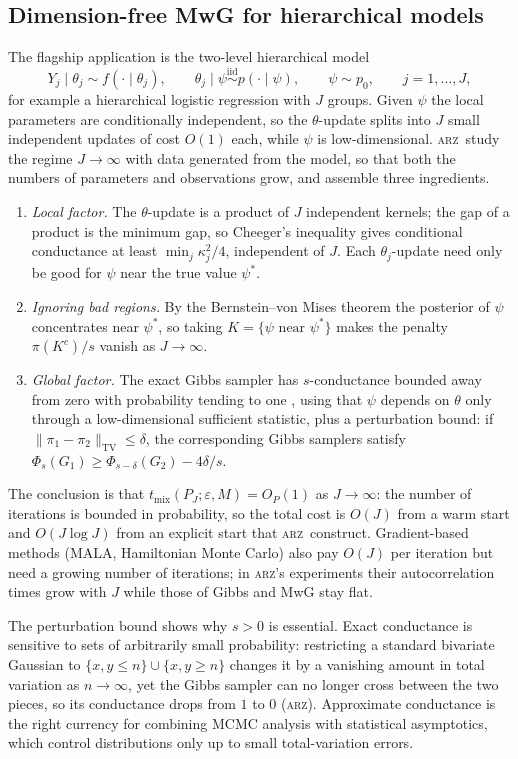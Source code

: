 \documentclass[11pt]{article}
\theoremstyle{remark}
\newcommand{\ARZ}{\textsc{arz}}
\newcommand{\TV}{\mathrm{TV}}
\newcommand{\tmix}{t_{\mathrm{mix}}}
\begin{document}
\subsection{Dimension-free MwG for hierarchical models}\label{sec:hier}
The flagship application is the two-level hierarchical model
\[
Y_j\mid\theta_j\sim f(\cdot\mid\theta_j),\qquad\theta_j\mid\psi\overset{\text{iid}}{\sim}p(\cdot\mid\psi),\qquad\psi\sim p_0,\qquad j=1,\dots,J,
\]
for example a hierarchical logistic regression with $J$ groups. Given $\psi$ the local parameters are conditionally independent, so the $\theta$-update splits into $J$ small independent updates of cost $O(1)$ each, while $\psi$ is low-dimensional. \ARZ\ study the regime $J\to\infty$ with data generated from the model, so that both the numbers of parameters and observations grow, and assemble three ingredients.
\begin{enumerate}[leftmargin=1.4em,nosep]
\item \emph{Local factor.} The $\theta$-update is a product of $J$ independent kernels; the gap of a product is the minimum gap, so Cheeger's inequality gives conditional conductance at least $\min_j\kappa_j^2/4$, independent of $J$. Each $\theta_j$-update need only be good for $\psi$ near the true value $\psi^*$.
\item \emph{Ignoring bad regions.} By the Bernstein--von Mises theorem the posterior of $\psi$ concentrates near $\psi^*$, so taking $K=\{\psi\text{ near }\psi^*\}$ makes the penalty $\pi(K^c)/s$ vanish as $J\to\infty$.
\item \emph{Global factor.} The exact Gibbs sampler has $s$-conductance bounded away from zero with probability tending to one \citep{ascolani2024dimension}, using that $\psi$ depends on $\theta$ only through a low-dimensional sufficient statistic, plus a perturbation bound: if $\|\pi_1-\pi_2\|_\TV\le\delta$, the corresponding Gibbs samplers satisfy $\Phi_s(G_1)\ge\Phi_{s-\delta}(G_2)-4\delta/s$.
\end{enumerate}
The conclusion is that $\tmix(P_J;\varepsilon,M)=O_P(1)$ as $J\to\infty$: the number of iterations is bounded in probability, so the total cost is $O(J)$ from a warm start and $O(J\log J)$ from an explicit start that \ARZ\ construct. Gradient-based methods (MALA, Hamiltonian Monte Carlo) also pay $O(J)$ per iteration but need a growing number of iterations; in \ARZ's experiments their autocorrelation times grow with $J$ while those of Gibbs and MwG stay flat.

The perturbation bound shows why $s>0$ is essential. Exact conductance is sensitive to sets of arbitrarily small probability: restricting a standard bivariate Gaussian to $\{x,y\le n\}\cup\{x,y\ge n\}$ changes it by a vanishing amount in total variation as $n\to\infty$, yet the Gibbs sampler can no longer cross between the two pieces, so its conductance drops from $1$ to $0$ (\ARZ). Approximate conductance is the right currency for combining MCMC analysis with statistical asymptotics, which control distributions only up to small total-variation errors.
\end{document}
